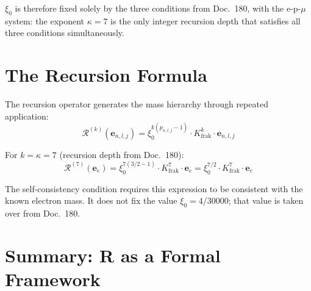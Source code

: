 $\xi_0$ is therefore fixed solely by the three conditions from
Doc.~180, with the e-p-$\mu$ system: the exponent $\kappa = 7$ is the
only integer recursion depth that satisfies all three conditions
simultaneously.

\section{The Recursion Formula}

The recursion operator generates the mass hierarchy through repeated
application:
\begin{equation}
  \mathcal{R}^{(k)}(\mathbf{e}_{n,l,j})
  = \xi_0^{k(p_{n,l,j}-1)} \cdot K_{\text{frak}}^k
  \cdot \mathbf{e}_{n,l,j}
  \label{eq:rekursion-k}
\end{equation}

For $k = \kappa = 7$ (recursion depth from Doc.~180):
\begin{equation}
  \mathcal{R}^{(7)}(\mathbf{e}_e) = \xi_0^{7(3/2-1)} \cdot K_{\text{frak}}^7
  \cdot \mathbf{e}_e
  = \xi_0^{7/2} \cdot K_{\text{frak}}^7 \cdot \mathbf{e}_e
\end{equation}

The self-consistency condition requires this expression to be
consistent with the known electron mass. It does not fix the value
$\xi_0 = 4/30000$; that value is taken over from Doc.~180.

\section{Summary: R as a Formal Framework}

\begin{center}
{\footnotesize
{}
}
\end{center}

